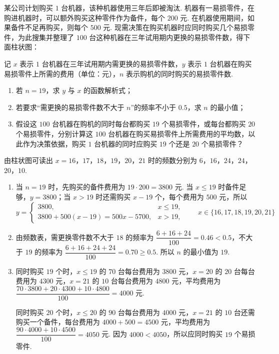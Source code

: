 \begin{problem}
某公司计划购买 \(1\) 台机器，该种机器使用三年后即被淘汰. 机器有一易损零件，在购进机器时，可以额外购买这种零件作为备件，每个 \(200\) 元. 在机器使用期间，如果备件不足再购买，则每个 \(500\) 元. 现需决策在购买机器时应同时购买几个易损零件，为此搜集并整理了 \(100\) 台这种机器在三年试用期内更换的易损零件数，得下面柱状图：

记 \(x\) 表示 \(1\) 台机器在三年试用期内需更换的易损零件数，\(y\) 表示 \(1\) 台机器在购买易损零件上所需的费用（单位：元），\(n\) 表示购机的同时购买的易损零件数.

\begin{enumerate}
\item 若 \(n=19\)，求 \(y\) 与 \(x\) 的函数解析式；
\item 若要求“需更换的易损零件数不大于 \(n\)”的频率不小于 \(0.5\)，求 \(n\) 的最小值；
\item 假设这 \(100\) 台机器在购机的同时每台都购买 \(19\) 个易损零件，或每台都购买 \(20\) 个易损零件，分别计算这 \(100\) 台机器在购买易损零件上所需费用的平均数，以此作为决策依据，购买 \(1\) 台机器的同时应购买 \(19\) 个还是 \(20\) 个易损零件？
\end{enumerate}

\problemresetlayout
{}
\end{problem}

\begin{solution}
由柱状图可读出 \(x=16\)，\(17\)，\(18\)，\(19\)，\(20\)，\(21\) 时的频数分别为 \(6\)，\(16\)，\(24\)，\(24\)，\(20\)，\(10\).

\begin{enumerate}
\item 当 \(n=19\) 时，先购买的备件费用为 \(19\cdot200=3800\) 元. 当 \(x\le19\) 时备件足够，\(y=3800\)；当 \(x>19\) 时还需购买 \(x-19\) 个，每个费用为 \(500\) 元，所以
\[
y=\begin{cases}
3800,&x\le19,\\
3800+500(x-19)=500x-5700,&x>19,
\end{cases}\qquad x\in\{16,17,18,19,20,21\}
\]
\item 由频数表，需更换零件数不大于 \(18\) 的频率为 \(\dfrac{6+16+24}{100}=0.46<0.5\)，不大于 \(19\) 的频率为 \(\dfrac{6+16+24+24}{100}=0.70\ge0.5\). 所以 \(n\) 的最小值为 \(19\).
\item 同时购买 \(19\) 个时，\(x\le19\) 的 \(70\) 台每台费用为 \(3800\) 元，\(x=20\) 的 \(20\) 台每台费用为 \(4300\) 元，\(x=21\) 的 \(10\) 台每台费用为 \(4800\) 元，平均费用为 \(\dfrac{70\cdot3800+20\cdot4300+10\cdot4800}{100}=4000\) 元.

同时购买 \(20\) 个时，\(x\le20\) 的 \(90\) 台每台费用为 \(4000\) 元，\(x=21\) 的 \(10\) 台还需购买一个备件，每台费用为 \(4000+500=4500\) 元，平均费用为 \(\dfrac{90\cdot4000+10\cdot4500}{100}=4050\) 元. 因为 \(4000<4050\)，所以应同时购买 \(19\) 个易损零件.
\end{enumerate}
\end{solution}

